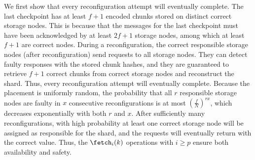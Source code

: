 We first show that every reconfiguration attempt will eventually complete.
The last checkpoint has at least $f+1$ encoded chunks stored on distinct correct storage nodes.
This is because that the \pushss messages for the last checkpoint must have been acknowledged by at least $2f+1$ storage nodes, among which at least $f+1$ are correct nodes.
During a reconfiguration, the correct responsible storage nodes (after reconfiguration) send \getsc requests to all storage nodes.
They can detect faulty responses with the stored chunk hashes, and they are guaranteed to retrieve $f+1$ correct chunks from correct storage nodes and reconstruct the shard.
Thus, every reconfiguration attempt will eventually complete.
Because the placement is uniformly random, the probability that all $r$ responsible storage nodes are faulty in $x$ consecutive reconfigurations is at most $(\frac{f}{N})^{rx}$, which decreases exponentially with both $r$ and $x$.
After sufficiently many reconfigurations, with high probability at least one correct storage node will be assigned as responsible for the shard, and the \retrieve requests will eventually return with the correct value.
Thus, the $\fetch_{i}(k)$ operations with $i \geq p$ ensure both availability and safety.